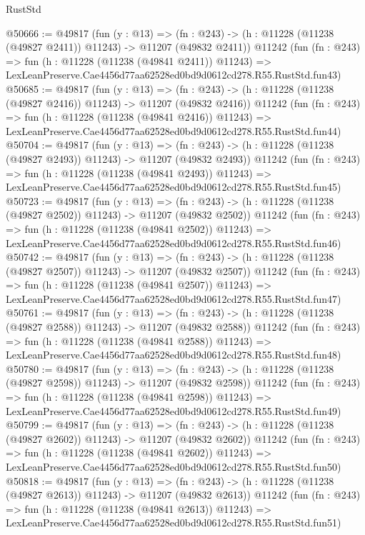 \begin{lexlean}{RustStd}
\begin{coremodule}
@50666 := @49817
    (fun (y : @13) =>
    (fn : @243) -> (h : @11228 (@11238 (@49827 @2411)) @11243) -> @11207 (@49832 @2411))
    @11242
    (fun (fn : @243) =>
    fun (h : @11228 (@11238 (@49841 @2411)) @11243) =>
    LexLeanPreserve.Cae4456d77aa62528ed0bd9d0612cd278.R55.RustStd.fun43)
@50685 := @49817
    (fun (y : @13) =>
    (fn : @243) -> (h : @11228 (@11238 (@49827 @2416)) @11243) -> @11207 (@49832 @2416))
    @11242
    (fun (fn : @243) =>
    fun (h : @11228 (@11238 (@49841 @2416)) @11243) =>
    LexLeanPreserve.Cae4456d77aa62528ed0bd9d0612cd278.R55.RustStd.fun44)
@50704 := @49817
    (fun (y : @13) =>
    (fn : @243) -> (h : @11228 (@11238 (@49827 @2493)) @11243) -> @11207 (@49832 @2493))
    @11242
    (fun (fn : @243) =>
    fun (h : @11228 (@11238 (@49841 @2493)) @11243) =>
    LexLeanPreserve.Cae4456d77aa62528ed0bd9d0612cd278.R55.RustStd.fun45)
@50723 := @49817
    (fun (y : @13) =>
    (fn : @243) -> (h : @11228 (@11238 (@49827 @2502)) @11243) -> @11207 (@49832 @2502))
    @11242
    (fun (fn : @243) =>
    fun (h : @11228 (@11238 (@49841 @2502)) @11243) =>
    LexLeanPreserve.Cae4456d77aa62528ed0bd9d0612cd278.R55.RustStd.fun46)
@50742 := @49817
    (fun (y : @13) =>
    (fn : @243) -> (h : @11228 (@11238 (@49827 @2507)) @11243) -> @11207 (@49832 @2507))
    @11242
    (fun (fn : @243) =>
    fun (h : @11228 (@11238 (@49841 @2507)) @11243) =>
    LexLeanPreserve.Cae4456d77aa62528ed0bd9d0612cd278.R55.RustStd.fun47)
@50761 := @49817
    (fun (y : @13) =>
    (fn : @243) -> (h : @11228 (@11238 (@49827 @2588)) @11243) -> @11207 (@49832 @2588))
    @11242
    (fun (fn : @243) =>
    fun (h : @11228 (@11238 (@49841 @2588)) @11243) =>
    LexLeanPreserve.Cae4456d77aa62528ed0bd9d0612cd278.R55.RustStd.fun48)
@50780 := @49817
    (fun (y : @13) =>
    (fn : @243) -> (h : @11228 (@11238 (@49827 @2598)) @11243) -> @11207 (@49832 @2598))
    @11242
    (fun (fn : @243) =>
    fun (h : @11228 (@11238 (@49841 @2598)) @11243) =>
    LexLeanPreserve.Cae4456d77aa62528ed0bd9d0612cd278.R55.RustStd.fun49)
@50799 := @49817
    (fun (y : @13) =>
    (fn : @243) -> (h : @11228 (@11238 (@49827 @2602)) @11243) -> @11207 (@49832 @2602))
    @11242
    (fun (fn : @243) =>
    fun (h : @11228 (@11238 (@49841 @2602)) @11243) =>
    LexLeanPreserve.Cae4456d77aa62528ed0bd9d0612cd278.R55.RustStd.fun50)
@50818 := @49817
    (fun (y : @13) =>
    (fn : @243) -> (h : @11228 (@11238 (@49827 @2613)) @11243) -> @11207 (@49832 @2613))
    @11242
    (fun (fn : @243) =>
    fun (h : @11228 (@11238 (@49841 @2613)) @11243) =>
    LexLeanPreserve.Cae4456d77aa62528ed0bd9d0612cd278.R55.RustStd.fun51)

\end{coremodule}
\end{lexlean}
